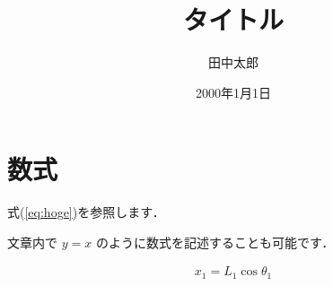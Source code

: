 \documentclass[a4paper,10pt]{jsarticle}
\title{タイトル}%
\author{田中太郎}%
\date{2000年1月1日}%
\begin{document}
\maketitle%

\section{数式}

式(\ref{eq:hoge})を参照します．

文章内で $y = x$ のように数式を記述することも可能です．

\begin{gather}
    x_{1}=L_{1} \cos \theta_{1}
    \label{eq:hoge}
\end{gather}
\end{document}
